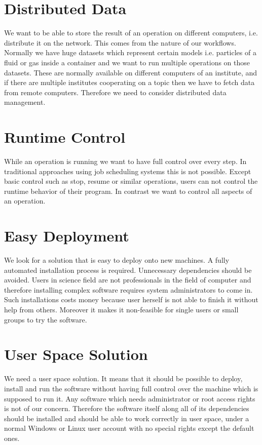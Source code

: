 \section{Distributed Data}
We want to be able to store the result of an operation on different computers, i.e. distribute it on the network.
This comes from the nature of our workflows. Normally we have huge datasets which represent certain models i.e.
particles of a fluid or gas inside a container and we want to run multiple operations on those datasets. These
are normally available on different computers of an institute, and if there are multiple institutes cooperating
on a topic then we have to fetch data from remote computers. Therefore we need to consider distributed data management.

\section{Runtime Control}
While an operation is running we want to have full control over every step. In traditional approaches using job
scheduling systems this is not possible. Except basic control such as stop, resume or similar operations, users
can not control the runtime behavior of their program. In contrast we want to control all aspects of an operation.

\section{Easy Deployment}
We look for a solution that is easy to deploy onto new machines. A fully automated installation process
is required. Unnecessary dependencies should be avoided. Users in science field are not professionals in the field
of computer and therefore installing complex software requires system administrators to come in. Such installations
costs money because user herself is not able to finish it without help from others. Moreover it makes it non-feasible
for single users or small groups to try the software.

\section{User Space Solution}
We need a user space solution. It means that it should be possible to deploy, install and run the software without
having full control over the machine which is supposed to run it. Any software which needs administrator or root access
rights is not of our concern. Therefore the software itself along all of its dependencies should be installed and should
be able to work correctly in user space, under a normal Windows or Linux user account with no special rights except the
default ones.

